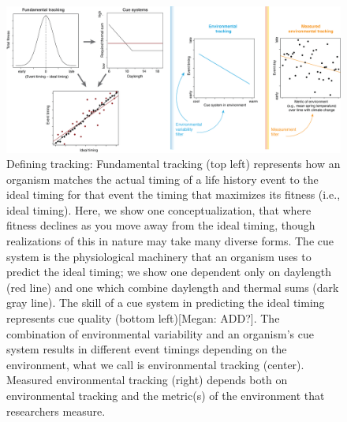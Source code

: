 \documentclass[11pt,letterpaper]{article}
\begin{document}
\begin{figure}[h!]
\centering
\includegraphics[width=1\textwidth]{..//..//..//R/graphs/conceptual/envtracking_define.png}
\caption{Defining tracking: Fundamental tracking (top left) represents how an organism matches the actual timing of a life history event to the ideal timing for that event the timing that maximizes its fitness (i.e., ideal timing). Here, we show one conceptualization, that where fitness declines as you move away from the ideal timing, though realizations of this in nature may take many diverse forms. The cue system is the physiological machinery that an organism uses to predict the ideal timing; we show one dependent only on daylength (red line) and one which combine daylength and thermal sums (dark gray line). The skill of a cue system in predicting the ideal timing represents cue quality (bottom left)[Megan: ADD?]. The combination of  environmental variability and an organism's cue system results in different event timings depending on the environment, what we call is environmental tracking (center). Measured environmental tracking (right) depends both on environmental tracking and the metric(s) of the environment that researchers measure. } 
 \label{fig:defineET}
\end{figure}
\end{document}
